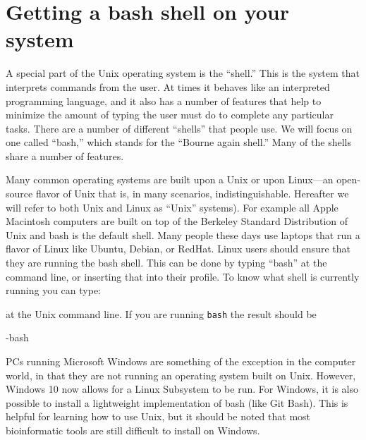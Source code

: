 \documentclass[]{krantz}
\makeatletter
\newenvironment{Shaded}{\begin{snugshade}}{\end{snugshade}}
\newcommand{\BuiltInTok}[1]{#1}
\newcommand{\ExtensionTok}[1]{#1}
\newcommand{\VariableTok}[1]{\textcolor[rgb]{0,0,0}{#1}}
\newenvironment{kframe}{%
\medskip{}
\setlength{\fboxsep}{.8em}
 \def\at@end@of@kframe{}%
 \ifinner\ifhmode%
  \def\at@end@of@kframe{\end{minipage}}%
  \begin{minipage}{\columnwidth}%
 \fi\fi%
 \def\FrameCommand##1{\hskip\@totalleftmargin \hskip-\fboxsep
 \colorbox{shadecolor}{##1}\hskip-\fboxsep
     \hskip-\linewidth \hskip-\@totalleftmargin \hskip\columnwidth}%
 \MakeFramed {\advance\hsize-\width
   \@totalleftmargin\z@ \linewidth\hsize
   \@setminipage}}%
 {\par\unskip\endMakeFramed%
 \at@end@of@kframe}
\renewenvironment{Shaded}{\begin{kframe}}{\end{kframe}}
\makeatother
\begin{document}
\hypertarget{getting-a-bash-shell-on-your-system}{%
\section{Getting a bash shell on your system}\label{getting-a-bash-shell-on-your-system}}

A special part of the Unix operating system is the ``shell.'' This is the system that
interprets commands from the user. At times it behaves like an interpreted programming
language, and it also has a number of features that help to minimize the amount of
typing the user must do to complete any particular tasks. There are a number of
different ``shells'' that people use. We will focus on one called ``bash,'' which stands
for the ``Bourne again shell.'' Many of the shells share a number of features.

Many common operating systems are built upon a Unix or upon Linux---an open-source flavor of
Unix that is, in many scenarios, indistinguishable. Hereafter we will refer
to both Unix and Linux as ``Unix'' systems). For example all Apple Macintosh computers are
built on top of the Berkeley Standard Distribution of Unix and bash is the default
shell. Many people these days
use laptops that run a flavor of Linux like Ubuntu, Debian, or RedHat. Linux
users should ensure that they are running the bash shell. This can be done
by typing ``bash'' at the command line, or inserting that into their profile.
To know what shell is currently running you can type:

\begin{Shaded}
\end{Shaded}

at the Unix command line. If you are running \texttt{bash} the result should
be

\begin{Shaded}
\begin{Highlighting}[]
\ExtensionTok{-bash}
\end{Highlighting}
\end{Shaded}

PCs running Microsoft Windows are something of the exception in the computer world, in that
they are not running an operating system built on Unix. However, Windows 10 now allows for
a Linux Subsystem to be run. For Windows, it is also possible to install a lightweight
implementation of bash (like Git Bash). This is helpful for learning how to use Unix,
but it should be noted that most bioinformatic tools are still difficult to install
on Windows.
\end{document}
